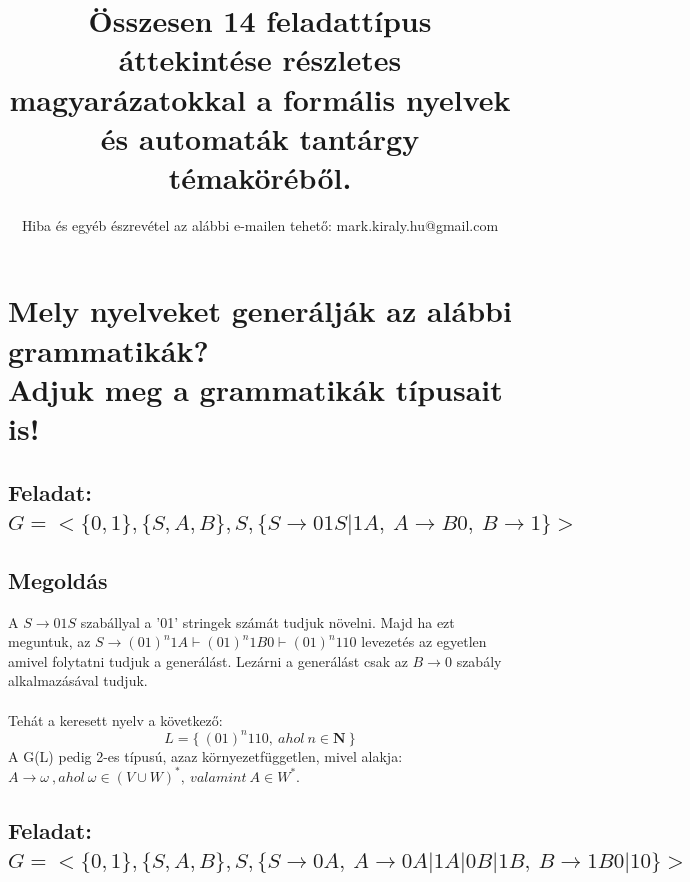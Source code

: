 \documentclass[12pt]{article}
\title{\textbf{Összesen 14 feladattípus áttekintése részletes magyarázatokkal 
    a formális nyelvek és automaták tantárgy témaköréből.}}
\author{Hiba és egyéb észrevétel az alábbi e-mailen tehető: mark.kiraly.hu@gmail.com}
\date{}
\begin{document}
\maketitle

\section{Mely nyelveket generálják az alábbi grammatikák? \\ Adjuk meg a grammatikák típusait is!}


\subsection{Feladat: \\
$ G=< \{0,1\}, \{S,A,B\}, S, \{ S \rightarrow 01S|1A,\ A \rightarrow B0,\ B \rightarrow 1 \}> $}
\maketitle
\subsection{Megoldás}
A $ S \rightarrow 01S $ szabállyal a '01' stringek számát tudjuk növelni. Majd ha ezt meguntuk, 
az $ S \rightarrow (01)^n1A \vdash (01)^n1B0 \vdash (01)^n110 $ levezetés az egyetlen amivel folytatni tudjuk 
a generálást. Lezárni a generálást csak az $ B \rightarrow 0 $ szabály alkalmazásával tudjuk. \\\\
Tehát a keresett nyelv a következő:
$$ L = \{ \ (01)^n110, \ ahol \ n \in \mathbf{N}  \ \} $$
A G(L) pedig 2-es típusú, azaz környezetfüggetlen, mivel alakja: \\
$ A \rightarrow \omega \ , ahol \ \omega \in (V \cup W)^* , \ valamint \ A \in W^*. $

\subsection{Feladat: \\
$ G=< \{0,1\}, \{S,A,B\}, S, \{ S \rightarrow 0A,\ A \rightarrow 0A|1A|0B|1B,\ B \rightarrow 1B0|10 \}> $}
\maketitle
\end{document}
